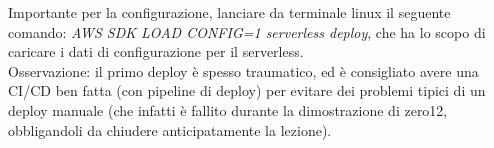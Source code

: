 \documentclass{classes/base}
\begin{document}
    Importante per la configurazione, lanciare da terminale linux il seguente comando: \textit{AWS SDK LOAD CONFIG=1 serverless deploy}, che ha lo scopo di caricare i dati di configurazione per il serverless.\\
    Osservazione: il primo deploy è spesso traumatico, ed è consigliato avere una CI/CD ben fatta (con pipeline di deploy) per evitare dei problemi tipici di un deploy manuale (che infatti è fallito durante la dimostrazione di zero12, obbligandoli da chiudere anticipatamente la lezione).
\end{document}
